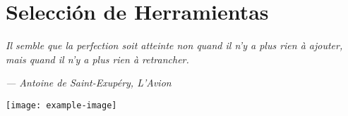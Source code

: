 \chapter{Selección de Herramientas}
\epigraph{\textit{Il semble que la perfection soit atteinte non quand il n’y a plus rien à ajouter, mais quand il n’y a plus rien à retrancher.     
	}}{\textit{— Antoine de Saint-Exupéry, L’Avion}}
	\vspace*{8cm}
	\begin{center}
		\centering
		\texttt{[image: example-image]}
	\end{center}
	\thispagestyle{empty}
	\newpage
\vspace*{2cm}
